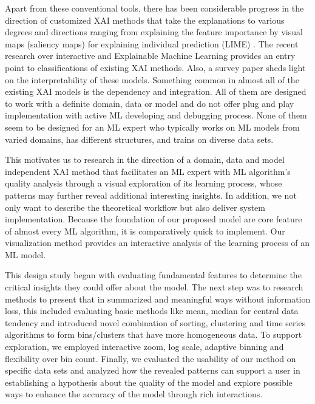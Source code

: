 \documentclass[journal]{vgtc}                %
\begin{document}
Apart from these conventional tools, there has been considerable progress in the direction of customized XAI methods
that take the explanations to various degrees and directions ranging from
explaining the feature importance by visual maps (saliency maps) \cite{saliency} for explaining individual prediction (LIME) \cite{lime}.
The recent research over interactive and Explainable Machine Learning \cite{xai} \cite{xai2} provides an entry point to classifications of
existing XAI methods.
Also, a survey paper \cite{2019survey} sheds light on the interpretability of these models.
Something common in almost all of the existing XAI models is the dependency and integration.
All of them are designed to work with a definite domain, data or model and
do not offer plug and play implementation with active ML developing and debugging process.
None of them seem to be designed for an ML expert who typically works on ML models from varied domains, has different structures, and trains on diverse data sets. 

This motivates us to research in the direction of a 
domain, data and model independent
XAI method
that facilitates an ML expert with ML algorithm's quality analysis
through a visual exploration of its learning process, whose patterns
may further reveal additional interesting insights.
In addition, we not only want to describe the theoretical workflow but also deliver system implementation.
Because the foundation of our proposed model are core feature of
almost every ML algorithm, it is comparatively quick to implement.
Our visualization method provides an interactive analysis of the learning process of an ML model.

This design study\cite{designStudy} began with evaluating fundamental features to determine the critical insights they could offer about the model.  The next step was to research methods to present that in summarized and meaningful ways without information loss, this included 
evaluating basic methods like mean, median for central data tendency and
introduced novel combination of sorting, clustering and time series algorithms to form bins/clusters that have more homogeneous data. 
To support exploration, we employed interactive zoom, log scale,
 adaptive binning and flexibility over bin count.
Finally, 
we evaluated the usability of our method on specific data sets and analyzed
how the revealed patterns can support a user in establishing a hypothesis about the quality of the model and explore possible ways to enhance the accuracy of the model through rich interactions.
\end{document}
